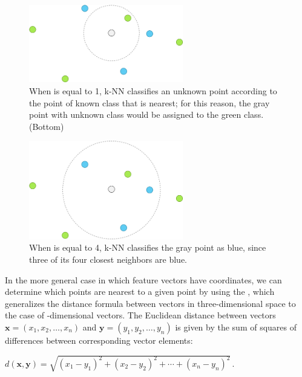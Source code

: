 \begin{figure}[h]
\centering
\mySfFamily
\includegraphics[width = 0.6\textwidth]{../images/knn_neighborhood_k=1.png}
\caption{When  is equal to 1, k-NN classifies an unknown point according to the point of known class that is nearest; for this reason, the gray point with unknown class would be assigned to the green class. (Bottom)}
\label{fig:knn_neighborhood_k=1}
\end{figure}

\begin{figure}[h]
\centering
\mySfFamily
\includegraphics[width = 0.6\textwidth]{../images/knn_neighborhood_k=4.png}
\caption{When  is equal to 4, k-NN classifies the gray point as blue, since three of its four closest neighbors are blue.}
\label{fig:knn_neighborhood_k=4}
\end{figure}

\begin{qbox}\end{qbox}

In the more general case in which feature vectors have  coordinates, we can determine which points are nearest to a given point by using the , which generalizes the distance formula between vectors in three-dimensional space to the case of -dimensional vectors. The Euclidean distance between vectors $\mathbf{x} = (x_1, x_2, \ldots, x_n)$ and $\mathbf{y} = (y_1, y_2, \ldots, y_n)$ is given by the sum of squares of differences between corresponding vector elements:
\begin{center}
$d(\mathbf{x}, \mathbf{y}) = \sqrt{(x_1 - y_1)^2 + (x_2 - y_2)^2 + \cdots + (x_n-y_n)^2}\,.$
\end{center}

